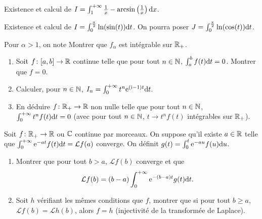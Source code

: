 \begin{exercise}
    Existence et calcul de $I=\int_{1}^{+\infty}\frac{1}{x}-\arcsin\left(\frac{1}{x}\right)\mathrm{d} x$.
\end{exercise}

\begin{exercise}
    Existence et calcul de $I=\int_{0}^{\frac{\pi}{2}}\ln(\sin(t))\mathrm{d} t$. On pourra poser $J=\int_{0}^{\frac{\pi}{2}}\ln(\cos(t))\mathrm{d} t$.
\end{exercise}

\begin{exercise}
    Pour $\alpha>1$, on note 
    Montrer que $f_{\alpha}$ est intégrable sur $\mathbb{R}_{+}$. 
\end{exercise}

\begin{exercise}
    \phantom{}
    \begin{enumerate}
        \item Soit $f\colon[a,b]\to\mathbb{R}$ continue telle que pour tout $n\in\mathbb{N}$, $\int_{a}^{b}f(t)\mathrm{d} t=0$. Montrer que $f=0$.
        \item Calculer, pour $n\in\mathbb{N}$, $I_{n}=\int_{0}^{+\infty}t^{n}\mathrm{e}^{(\mathrm{i}-1)t}\mathrm{d} t$.
        \item En déduire $f\colon\mathbb{R}_{+}\to\mathbb{R}$ non nulle telle que pour tout $n\in\mathbb{N}$, $\int_{0}^{+\infty}t^{n}f(t)\mathrm{d} t=0$ (avec pour tout $n\in\mathbb{N}$, $t\to t^{n}f(t)$ intégrables sur $\mathbb{R}_{+}$). 
    \end{enumerate}
\end{exercise}

\begin{exercise}
    Soit $f\colon\mathbb{R}_{+}\to\mathbb{R}$ ou $\mathbb{C}$ continue par morceaux. On suppose qu'il existe $a\in\mathbb{R}$ telle que $\int_{0}^{+\infty}\mathrm{e}^{-at}f(t)\mathrm{d} t=\mathcal{L}f(a)$ converge. On définit $g(t)=\int_{0}^{t}\mathrm{e}^{-a u}f(u)\mathrm{d} u$.
    \begin{enumerate}
        \item Montrer que pour tout $b>a$, $\mathcal{L}f(b)$ converge et que 
        \begin{equation}
            \mathcal{L}f(b)=(b-a)\int_{0}^{+\infty}\mathrm{e}^{-(b-a)t}g(t)\mathrm{d} t.
        \end{equation}
        \item Soit $h$ vérifiant les mêmes conditions que $f$, montrer que si pour tout $b\geqslant a$, $\mathcal{L}f(b)=\mathcal{L}h(b)$, alors $f=h$ (injectivité de la transformée de Laplace).
    \end{enumerate}
\end{exercise}

